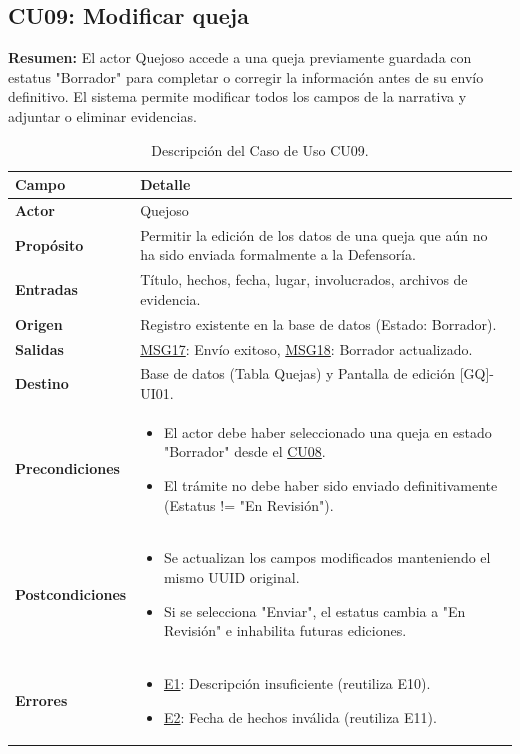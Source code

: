 \begin{appendices}
\subsection{CU09: Modificar queja}

\textbf{Resumen:} 
El actor Quejoso accede a una queja previamente guardada con estatus "Borrador" para completar o corregir la información antes de su envío definitivo. El sistema permite modificar todos los campos de la narrativa y adjuntar o eliminar evidencias.

\begin{table}[htbp]
\centering
\small
\begin{tabular}{|p{3.5cm}|p{10.5cm}|}
\hline
\rowcolor[HTML]{EFEFEF} 
\textbf{Campo} & \textbf{Detalle} \\ \hline
\textbf{Actor} & Quejoso \\ \hline
\textbf{Propósito} & Permitir la edición de los datos de una queja que aún no ha sido enviada formalmente a la Defensoría. \\ \hline
\textbf{Entradas} & Título, hechos, fecha, lugar, involucrados, archivos de evidencia. \\ \hline
\textbf{Origen} & Registro existente en la base de datos (Estado: Borrador). \\ \hline
\textbf{Salidas} & \hyperlink{msg:MSG17}{MSG17}: Envío exitoso, \hyperlink{msg:MSG18}{MSG18}: Borrador actualizado. \\ \hline
\textbf{Destino} & Base de datos (Tabla Quejas) y Pantalla de edición [GQ]-UI01. \\ \hline
\textbf{Precondiciones} & 
\begin{itemize}[nosep, leftmargin=*]
    \item El actor debe haber seleccionado una queja en estado "Borrador" desde el \hyperlink{anexo:casos_uso}{CU08}.
    \item El trámite no debe haber sido enviado definitivamente (Estatus != "En Revisión").
\end{itemize} \\ \hline
\textbf{Postcondiciones} & 
\begin{itemize}[nosep, leftmargin=*]
    \item Se actualizan los campos modificados manteniendo el mismo UUID original.
    \item Si se selecciona "Enviar", el estatus cambia a "En Revisión" e inhabilita futuras ediciones.
\end{itemize} \\ \hline
\textbf{Errores} & 
\begin{itemize}[nosep, leftmargin=*]
    \item \hyperlink{err:E10}{E1}: Descripción insuficiente (reutiliza E10).
    \item \hyperlink{err:E11}{E2}: Fecha de hechos inválida (reutiliza E11).
\end{itemize} \\ \hline
\end{tabular}
\caption{Descripción del Caso de Uso CU09.}
\label{tab:cu09_especificacion}
\end{table}


\end{appendices}
